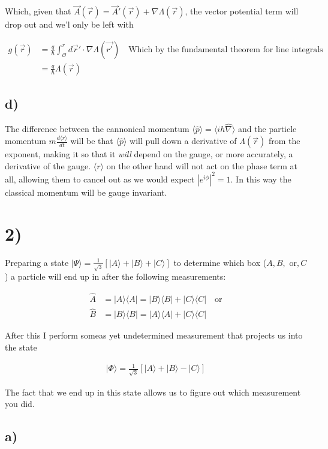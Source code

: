 \documentclass{article}
\newcommand{\braket}[1]{\langle#1\rangle}
\newcommand{\bra}[1]{|#1\rangle}
\newcommand{\ket}[1]{\langle#1|}
\begin{document}
Which, given that $\vec{A}(\vec{r})=\vec{A}'(\vec{r})+\nabla\Lambda(\vec{r})$, the vector potential term will drop out and we'l only be left with

\begin{align*}
    g(\vec{r})&=\frac{q}{\hbar}\int_{\mathcal{O}}^rd\vec{r}'\cdot{}\nabla\Lambda(\vec{r'})\quad\text{Which by the fundamental theorem for line integrals}\\[1em]
    &=\frac{q}{\hbar}\Lambda(\vec{r})
\end{align*}

\subsection*{d)}
The difference between the cannonical momentum $\braket{\hat{p}}=\braket{ih\hat{\nabla}}$ and the particle momentum $m\frac{d\braket{r}}{dt}$ will be that $\braket{\hat{p}}$ will pull down a derivative of $\Lambda(\vec{r})$ from the exponent, making it so that it \textit{will} depend on the gauge, or more accurately, a derivative of the gauge. $\braket{r}$ on the other hand will not act on the phase term at all, allowing them to cancel out as we would expect $|e^{i\phi}|^2=1$. In this way the classical momentum will be gauge invariant.


\section*{2)}
Preparing a state $\bra{\Psi}=\frac{1}{\sqrt3}[\bra{A}+\bra{B}+\bra{C}]$ to determine which box ($A,B,\text{ or},C$) a particle will end up in after the following measurements:

\begin{align*}
    \hat{A}&=\bra{A}\ket{A}=\bra{B}\ket{B}+\bra{C}\ket{C}\quad\text{or}\\[1em]
    \hat{B}&=\bra{B}\ket{B}=\bra{A}\ket{A}+\bra{C}\ket{C}
\end{align*}

After this I perform someas yet undetermined measurement that projects us into the state

\begin{align*}
    \bra{\Phi}=\frac{1}{\sqrt{3}}[\bra{A}+\bra{B}-\bra{C}]
\end{align*}

The fact that we end up in this state allows us to figure out which measurement you did.


\subsection*{a)}
\end{document}
